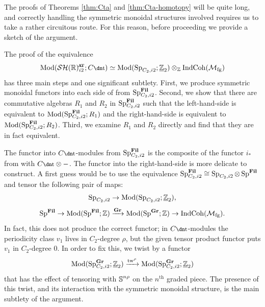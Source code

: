The proofs of Theorems \ref{thm:Cta} and \ref{thm:Cta-homotopy} will be quite long, and correctly handling the symmetric monoidal structures involved requires us to take a rather circuitous route. For this reason, before proceeding we provide a sketch of the argument.

The proof of the equivalence
\[ \Mod ( \SHR^{\at} _{i2} ; C\ta ) \simeq \Mod ( \Sp_{C_2, i2}; \uZt) \otimes_{\Z} \mathrm{IndCoh}(\mathcal{M}_{\mathrm{fg}}) \]
has three main steps and one significant subtlety.
First, we %
produce symmetric monoidal functors into each side of  from $\operatorname{\mathrm{Sp}}_{C_2,i2}^{\operatorname{\mathbf{Fil}}}$.
Second, we show that there are commutative algebras $R_1$ and $R_2$ in $\operatorname{\mathrm{Sp}}_{C_2, i2}^{\operatorname{\mathbf{Fil}}}$ such that the left-hand-side is equivalent to $\mathrm{Mod} ( \operatorname{\mathrm{Sp}}_{C_2, i2}^{\operatorname{\mathbf{Fil}}} ; R_1)$ and the right-hand-side is equivalent to $\mathrm{Mod} ( \operatorname{\mathrm{Sp}}_{C_2, i2}^{\operatorname{\mathbf{Fil}}} ; R_2)$.
Third, we examine $R_1$ and $R_2$ directly and find that they are in fact equivalent.

The functor into $C\ta$-modules from $\operatorname{\mathrm{Sp}}_{C_2,i2}^{\operatorname{\mathbf{Fil}}}$ is the composite of the functor $i_*$ from  with $C\ta \otimes -$.
The functor into the right-hand-side is more delicate to construct. A first guess would be to use the equivalence $\operatorname{\mathrm{Sp}}_{C_2,i2}^{\operatorname{\mathbf{Fil}}} \cong \operatorname{\mathrm{Sp}}_{C_2,i2} \otimes \operatorname{\mathrm{Sp}}^{\operatorname{\mathbf{Fil}}}$ and tensor the following pair of maps:
\[ \operatorname{\mathrm{Sp}}_{C_2, i2} \to \mathrm{Mod} ( \operatorname{\mathrm{Sp}}_{C_2, i2} ; \underline{\mathbb{Z}}_{2} ), \]
\[ \operatorname{\mathrm{Sp}}^{\operatorname{\mathbf{Fil}}} \to \mathrm{Mod} ( \operatorname{\mathrm{Sp}}^{\operatorname{\mathbf{Fil}}} ; \mathbb{Z}) \xrightarrow{\operatorname{\mathbf{Gr}}} \mathrm{Mod} ( \operatorname{\mathrm{Sp}}^{\operatorname{\mathbf{Gr}}} ; \mathbb{Z} ) \to \mathrm{IndCoh}(\mathcal{M}_{\mathrm{fg}}) . \]
In fact, this does not produce the correct functor; in $C\ta$-modules the periodicity class $v_1$ lives in $C_2$-degree $\rho$, but the given tensor product functor puts $v_1$ in $C_2$-degree 0. In order to fix this, we twist by a functor
\[ \mathrm{Mod} (\operatorname{\mathrm{Sp}}_{C_2,i2}^{\operatorname{\mathbf{Gr}}}; \underline{\mathbb{Z}}_{2}) \xrightarrow{\mathrm{tw}^{\rho}} \mathrm{Mod} (\operatorname{\mathrm{Sp}}_{C_2,i2}^{\operatorname{\mathbf{Gr}}}; \underline{\mathbb{Z}}_{2})\]
that has the effect of tensoring with $\operatorname{\mathbb{S}}^{n\rho}$ on the $n^{\mathrm{th}}$ graded piece.
The presence of this twist, and its interaction with the symmetric monoidal structure, is the main subtlety of the argument.

